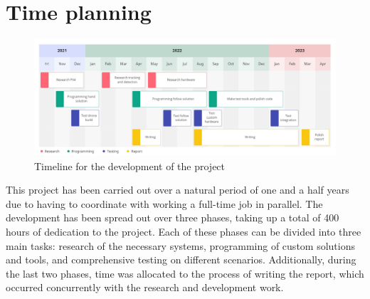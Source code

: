 \section{Time planning}
\label{sec:time-planning}

\begin{figure}
  \centering
  \includegraphics[width=\textwidth,keepaspectratio]{img/project-timeline.jpg}
  \caption{Timeline for the development of the project}
  \label{fig:project-timeline}
\end{figure}

This project has been carried out over a natural period of one and a half years due to having to coordinate with working a full-time job in parallel.
The development has been spread out over three phases, taking up a total of 400 hours of dedication to the project.
Each of these phases can be divided into three main tasks: research of the necessary systems, programming of custom solutions and tools, and comprehensive testing on different scenarios.
Additionally, during the last two phases, time was allocated to the process of writing the report, which occurred concurrently with the research and development work.


